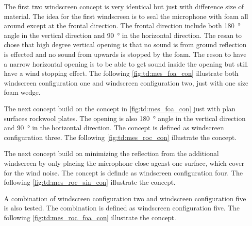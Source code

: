     
The first two windscreen concept is very identical but just with difference size of material. The idea for the first windscreen is to seal the microphone with foam all around except at the frontal direction. The frontal direction include both \SI{180}{\degree} angle in the vertical direction and \SI{90}{\degree} in the horizontal direction. The resan to chose that high degree vertical opening is that no sound is from ground reflection is effected and no sound from upwards is stopped by the foam. The reson to have a narrow horizontal  opening is to be able to get sound inside the opening but still have a wind stopping effect. The following \autoref{fig:td:mes_foa_con} illustrate both windscreen configuration one and windscreen configuration two, just with one size foam wedge.
    

The next concept build on the concept in \autoref{fig:td:mes_foa_con} just with plan surfaces rockwool plates. The opening is also \SI{180}{\degree} angle in the vertical direction and \SI{90}{\degree} in the horizontal direction. The concept is defined as windscreen configuration three. The following \autoref{fig:td:mes_roc_con} illustrate the concept.



The next concept build on minimizing the reflection from the additional windscreen by only placing the microphone close agenst one surface, which cover for the wind noise. The concept is definde as windscreen configuration four. The following \autoref{fig:td:mes_roc_sin_con} illustrate the concept.




A combination of windscreen configuration two and windscreen configuration five is also tested. The combination is defined as windscreen configuration five. The following \autoref{fig:td:mes_roc_foa_con} illustrate the concept.

